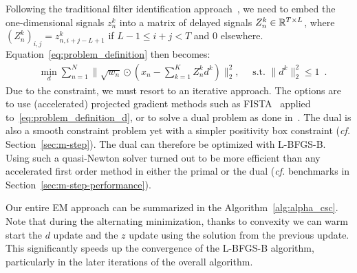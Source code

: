 Following the traditional filter identification approach~\citep{moulines1995subspace}, we need to embed the one-dimensional signals $z_n^k$ into a matrix of delayed signals $Z_n^{k} \in \mathbb{R}^{T \times L}$, where $ (Z_n^{k})_{i,j} = z_{n,i + j - L + 1}^k$ if $ L - 1 \le i+j < T$ and $0$ elsewhere. Equation~\eqref{eq:problem_definition} then becomes:
%
\begin{align}
& \min_{d} \sum_{n=1}^{N} \|\sqrt{w_n} \odot (x_{n} - \sum_{k=1}^{K}Z_{n}^{k}d^{k})\|_{2}^{2}, \quad \text{  s.t.  } \|d^k\|_2^2 \leq 1 \enspace.
\label{eq:problem_definition_d}
\end{align}
%
Due to the constraint, we must resort to an iterative approach. The options are to use (accelerated) projected gradient methods such as FISTA~\citep{beck2009fast} applied to~\eqref{eq:problem_definition_d}, or to solve a dual problem as done in~\cite{Grosse-etal:2007}. The dual is also a smooth constraint problem yet with a simpler positivity box constraint (\textit{cf.} Section~\ref{sec:m-step}). The dual can therefore be optimized with L-BFGS-B. Using such a quasi-Newton solver turned out to be more efficient than any accelerated first order method in either the primal or the dual (\textit{cf.} benchmarks in Section~\ref{sec:m-step-performance}).
%




Our entire \ac{EM} approach can be summarized in the Algorithm~\ref{alg:alpha_csc}.
Note that during the alternating minimization, thanks to convexity we can warm start the $d$ update and the $z$ update using the solution from the previous update. This significantly speeds up the convergence of the L-BFGS-B algorithm, particularly in the later iterations of the overall algorithm.


